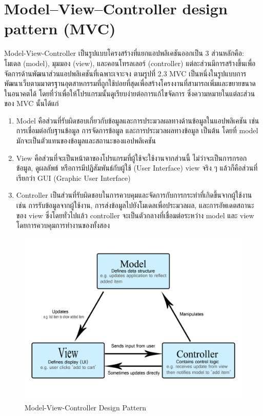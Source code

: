\section{Model–View–Controller design pattern (MVC)}
Model-View-Controller \cite{mvc} เป็นรูปแบบโครงสร้างที่แยกแอปพลิเคชันออกเป็น 3 ส่วนหลักคือ: โมเดล (model), มุมมอง (view), 
และคอนโทรลเลอร์ (controller) แต่ละส่วนมีการสร้างขึ้นเพื่อจัดการด้านพัฒนาส่วนแอปพลิเคชันที่เฉพาะเจาะจง ตามรูปที่ 2.3 MVC 
เป็นหนึ่งในรูปแบบการพัฒนาเว็บตามมาตรฐานอุตสาหกรรมที่ถูกใช้บ่อยที่สุดเพื่อสร้างโครงงานที่สามารถเพิ่มและขยายขนาดในอนาคตได้ 
โดยที่ว่าเพื่อให้โปรแกรมนั้นดูเรียบง่ายต่อการแก้ไขจัดการ ซึ่งความหมายในแต่ละส่วนของ MVC นั้นได้แก่ 
\begin{enumerate}
  \item Model คือส่วนที่รับผิดชอบเกี่ยวกับข้อมูลและการประมวลผลทางด้านข้อมูลในแอปพลิเคชัน เช่น การเชื่อมต่อกับฐานข้อมูล การจัดการข้อมูล 
  และการประมวลผลทางข้อมูล เป็นต้น โดยที่ model มักจะเป็นตัวแทนของข้อมูลและสถานะของแอปพลิเคชัน
  \item View คือส่วนที่จะเป็นหน้าตาของโปรแกรมที่ผู้ใช้จะใช้งานจากส่วนนี้ ไม่ว่าจะเป็นการกรอกข้อมูล, ดูผลลัพธ์ หรือการมีปฏิสัมพันธ์กับผู้ใช้ 
  (User Interface) view จริง ๆ แล้วก็คือส่วนที่เรียกว่า GUI (Graphic User Interface) 
  \item Controller เป็นส่วนที่รับผิดชอบในการควบคุมและจัดการกับการกระทำที่เกิดขึ้นจากผู้ใช้งาน เช่น การรับข้อมูลจากผู้ใช้งาน, 
  การส่งข้อมูลไปยังโมเดลเพื่อประมวลผล, และการอัพเดตสถานะของ view ซึ่งโดยทั่วไปแล้ว controller จะเป็นตัวกลางที่เชื่อมต่อระหว่าง model 
  และ view โดยการควบคุมการทำงานของทั้งสอง 
\end{enumerate}
\begin{figure}[ht]
  \begin{center}
  \includegraphics[scale=0.3]{resources/MVC.png}
  \end{center}
  \caption[Model-View-Controller]{Model-View-Controller Design Pattern}
  \label{fig:mvc}
\end{figure}

